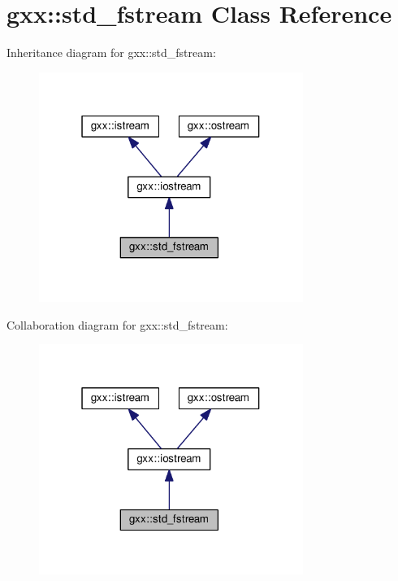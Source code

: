 \hypertarget{classgxx_1_1std__fstream}{}\section{gxx\+:\+:std\+\_\+fstream Class Reference}
\label{classgxx_1_1std__fstream}


Inheritance diagram for gxx\+:\+:std\+\_\+fstream\+:
\nopagebreak
\begin{figure}[H]
\begin{center}
\leavevmode
\includegraphics[width=244pt]{classgxx_1_1std__fstream__inherit__graph}
\end{center}
\end{figure}


Collaboration diagram for gxx\+:\+:std\+\_\+fstream\+:
\nopagebreak
\begin{figure}[H]
\begin{center}
\leavevmode
\includegraphics[width=244pt]{classgxx_1_1std__fstream__coll__graph}
\end{center}
\end{figure}

